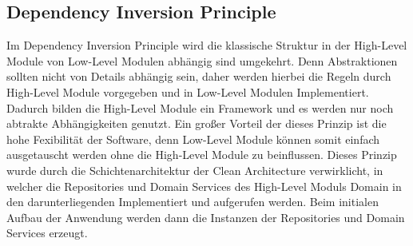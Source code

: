 \subsection{Dependency Inversion Principle}
Im Dependency Inversion Principle wird die klassische Struktur in der High-Level Module von Low-Level Modulen abhängig sind umgekehrt.
Denn Abstraktionen sollten nicht von Details abhängig sein, daher werden hierbei die Regeln durch High-Level Module vorgegeben und in Low-Level Modulen Implementiert.
Dadurch bilden die High-Level Module ein Framework und es werden nur noch abtrakte Abhängigkeiten genutzt.
Ein großer Vorteil der dieses Prinzip ist die hohe Fexibilität der Software, denn Low-Level Module können somit einfach ausgetauscht werden ohne die High-Level Module zu beinflussen.
Dieses Prinzip wurde durch die Schichtenarchitektur der Clean Architecture verwirklicht,
in welcher die Repositories und Domain Services des High-Level Moduls Domain in den darunterliegenden Implementiert und aufgerufen werden.
Beim initialen Aufbau der Anwendung werden dann die Instanzen der Repositories und Domain Services erzeugt.

\newpage
